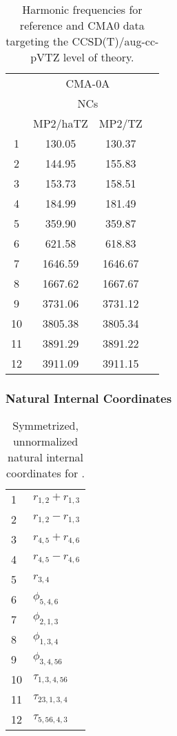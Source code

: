 \documentclass[10pt,oneside]{article}
\begin{document}
\begin{table}[h!]
\centering
\caption{Harmonic frequencies for reference and CMA0 data targeting the CCSD(T)/aug-cc-pVTZ level of theory.}
\begin{tabular}{cccc}
\toprule
 & \multicolumn{2}{c}{CMA-0A} \\
 & \multicolumn{2}{c}{NCs} \\
 & MP2/haTZ & MP2/TZ \\
\midrule
1 & 130.05 & 130.37 \\
2 & 144.95 & 155.83 \\
3 & 153.73 & 158.51 \\
4 & 184.99 & 181.49 \\
5 & 359.90 & 359.87 \\
6 & 621.58 & 618.83 \\
7 & 1646.59 & 1646.67 \\
8 & 1667.62 & 1667.67 \\
9 & 3731.06 & 3731.12 \\
10 & 3805.38 & 3805.34 \\
11 & 3891.29 & 3891.22 \\
12 & 3911.09 & 3911.15 \\
\bottomrule
\end{tabular}
\end{table}

\clearpage

\subsubsection*{Natural Internal Coordinates}
\begin{table}[h!]
\centering
\caption{Symmetrized, unnormalized natural internal coordinates for .}
\small
\begin{tabular}{ll}
  1   & $r_{1,2} + r_{1,3}$ \\
  2   & $r_{1,2} - r_{1,3}$ \\
  3   & $r_{4,5} + r_{4,6}$ \\
  4   & $r_{4,5} - r_{4,6}$ \\
  5   & $r_{3,4}$ \\
  6   & $\phi_{5,4,6}$ \\
  7   & $\phi_{2,1,3}$ \\
  8   & $\phi_{1,3,4}$ \\
  9   & $\phi_{3,4,5 6}$ \\
  10  & $\tau_{1,3,4,5 6}$ \\
  11  & $\tau_{2 3,1,3,4}$ \\
  12  & $\tau_{5,5 6,4,3}$ \\
\end{tabular}
\end{table}

\clearpage
\end{document}
